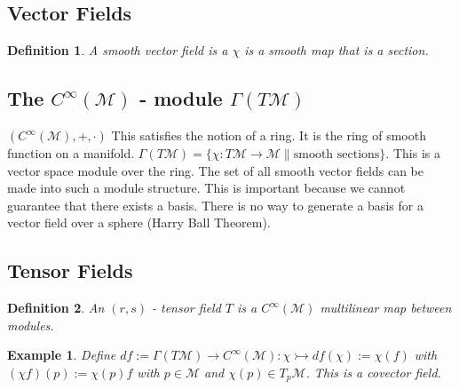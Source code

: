 \documentclass[10pt, oneside]{article}
\newcommand{\M}{\mathcal{M}}
\newtheorem{defn}{Definition}
\newtheorem{example}{Example}
\begin{document}
   \subsection*{Vector Fields}
   \begin{defn}
      A smooth vector field is a $\chi$ is a smooth map that is a section. 
   \end{defn}
   \subsection*{The $C^\infty (\M)$ - module $\Gamma (T \M)$}
   $(C^{\infty} (\M), +, \cdot)$ This satisfies the notion of a ring. It is the ring of smooth function on a manifold. $\Gamma (T \M) = \{ \chi : T \M \to \M \| \text{smooth sections} \}$. This is a vector space module over the ring. The set of all smooth vector fields can be made into such a module structure. This is important because we cannot guarantee that there exists a basis. There is no way to generate a basis for a vector field over a sphere (Harry Ball Theorem). 
   \subsection*{Tensor Fields}
   \begin{defn}
      An $(r,s)$ - tensor field $T$ is a $C^{\infty} (\M)$ multilinear map between modules.
   \end{defn}
   \begin{example}
      Define $df := \Gamma(T \M) \to C^\infty (\M): \chi \rightarrowtail df(\chi) := \chi (f)$ with $(\chi f)(p) := \chi (p) f $ with $p \in \M$ and $\chi(p) \in T_p \M$. This is a covector field. 
   \end{example}
\end{document}
